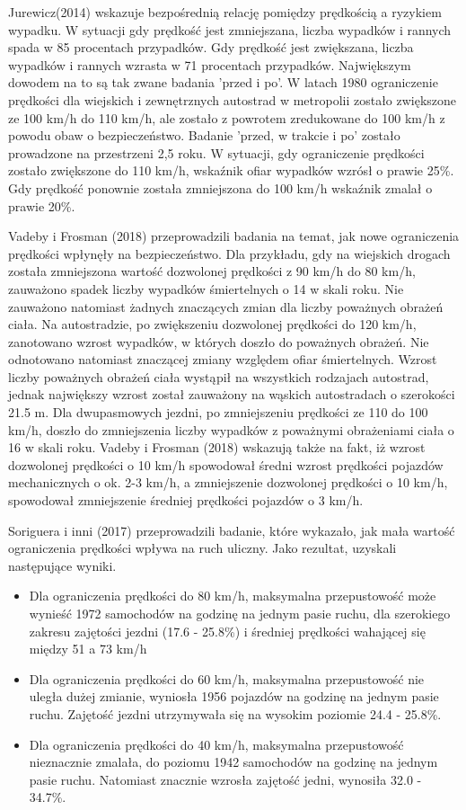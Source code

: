 Jurewicz(2014) wskazuje bezpośrednią relację pomiędzy prędkością a ryzykiem wypadku. W sytuacji gdy prędkość jest zmniejszana,  liczba wypadków i rannych spada w 85 procentach przypadków. Gdy prędkość jest zwiększana, liczba wypadków i rannych wzrasta w 71 procentach przypadków. Największym dowodem na to są tak zwane badania 'przed i po'. W latach 1980 ograniczenie prędkości dla wiejskich i zewnętrznych autostrad w metropolii zostało zwiększone ze 100 km/h do 110 km/h, ale zostało  z powrotem zredukowane do 100 km/h z powodu obaw o bezpieczeństwo. Badanie 'przed, w trakcie i po' zostało prowadzone na przestrzeni 2,5 roku. W sytuacji, gdy ograniczenie prędkości zostało zwiększone do 110 km/h, wskaźnik ofiar wypadków wzrósł o prawie 25\%. Gdy prędkość ponownie została zmniejszona do 100 km/h wskaźnik zmalał o prawie 20\%.

Vadeby i Frosman (2018) przeprowadzili badania na temat, jak nowe ograniczenia prędkości wpłynęły na bezpieczeństwo. Dla przykładu, gdy na wiejskich drogach została zmniejszona wartość dozwolonej prędkości z 90 km/h do 80 km/h, zauważono spadek liczby wypadków śmiertelnych o 14 w skali roku. Nie zauważono natomiast żadnych znaczących zmian dla liczby poważnych obrażeń ciała. Na autostradzie, po zwiększeniu dozwolonej prędkości do 120 km/h, zanotowano wzrost wypadków, w których doszło do poważnych obrażeń. Nie odnotowano natomiast znaczącej zmiany względem ofiar śmiertelnych. Wzrost liczby poważnych obrażeń ciała wystąpił na wszystkich rodzajach autostrad, jednak największy wzrost został zauważony na wąskich autostradach o szerokości 21.5 m. Dla dwupasmowych jezdni, po zmniejszeniu prędkości ze 110 do 100 km/h, doszło do zmniejszenia liczby wypadków z poważnymi obrażeniami ciała o 16 w skali roku. Vadeby i Frosman (2018) wskazują także na fakt, iż wzrost dozwolonej prędkości o 10 km/h spowodował średni wzrost prędkości pojazdów mechanicznych o ok. 2-3 km/h, a zmniejszenie dozwolonej prędkości o 10 km/h, spowodował zmniejszenie średniej prędkości pojazdów o 3 km/h.

Soriguera i inni (2017) przeprowadzili badanie, które wykazało, jak mała wartość ograniczenia prędkości wpływa na ruch uliczny. Jako rezultat, uzyskali następujące wyniki.

\begin{itemize}
\item Dla ograniczenia prędkości do 80 km/h, maksymalna przepustowość może wynieść 1972 samochodów na godzinę na jednym pasie ruchu, dla szerokiego zakresu zajętości jezdni (17.6 - 25.8\%) i średniej prędkości wahającej się między 51 a 73 km/h
\item Dla ograniczenia prędkości do 60 km/h, maksymalna przepustowość nie uległa dużej zmianie, wyniosła 1956 pojazdów na godzinę na jednym pasie ruchu. Zajętość jezdni utrzymywała się na wysokim poziomie 24.4 - 25.8\%.
\item Dla ograniczenia prędkości do 40 km/h, maksymalna przepustowość nieznacznie zmalała, do poziomu 1942 samochodów na godzinę na jednym pasie ruchu. Natomiast znacznie wzrosła zajętość jedni, wynosiła 32.0 - 34.7\%.
\end{itemize}


